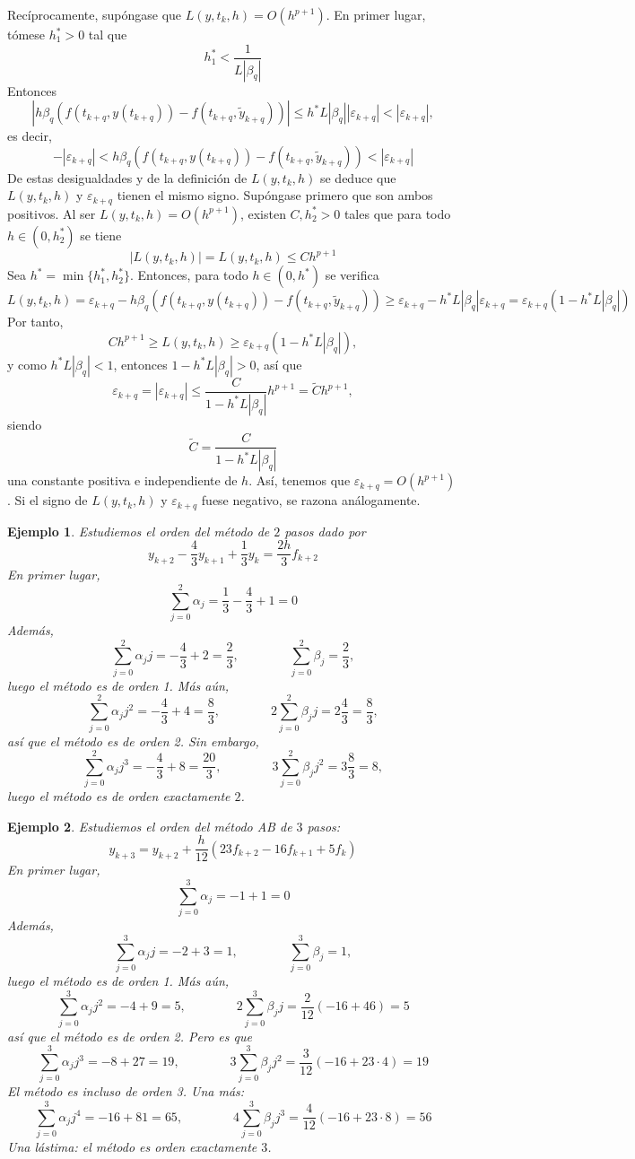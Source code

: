 \documentclass[11pt]{report}
\makeatletter
\renewenvironment{proof}[1][\proofname]{\par
  \pushQED{\qed}%
  \normalfont \topsep\z@skip %
  \trivlist
  \item[\hskip\labelsep
        \itshape
    #1\@addpunct{.}]\ignorespaces
}{%
  \popQED\endtrivlist\@endpefalse
}
\theoremstyle{mytheorem}
\theoremstyle{mydefinition}
\theoremstyle{myexample}
\newtheorem*{example}{Ejemplo}
\let\oldproofname=\proofname
\renewcommand{\proofname}{\rm\bf{\oldproofname}}}
\newcommand{\bars}[1]{\left| #1 \right|}
\makeatother
\begin{document}
\begin{proof}
Recíprocamente, supóngase que $L(y,t_k,h) = O(h^{p+1})$. En primer lugar, tómese $h^*_1>0$ tal que
\[h^*_1<\frac{1}{L|\beta_q|}\]
Entonces
\[\bars{h\beta_q\left(f(t_{k+q},y(t_{k+q}))-f(t_{k+q},\widetilde{y}_{k+q})\right) }\leq h^*L|\beta_q||\varepsilon_{k+q}| < |\varepsilon_{k+q}|,\]
es decir,
\[-|\varepsilon_{k+q}| < h\beta_q\left(f(t_{k+q},y(t_{k+q}))-f(t_{k+q},\widetilde{y}_{k+q})\right) <|\varepsilon_{k+q}|\]
De estas desigualdades y de la definición de $L(y,t_k,h)$ se deduce que $L(y,t_k,h)$ y $\varepsilon_{k+q}$ tienen el mismo signo. Supóngase primero que son ambos positivos. Al ser $L(y,t_k,h) = O(h^{p+1})$, existen $C,h^*_2>0$ tales que para todo $h \in (0,h^*_2)$ se tiene
\[|L(y,t_k,h)|=L(y,t_k,h) \leq Ch^{p+1}\]
Sea $h^* = \min\{h^*_1,h^*_2\}$. Entonces, para todo $h \in (0,h^*)$ se verifica
\[L(y,t_k,h) = \varepsilon_{k+q}-h\beta_q\left(f(t_{k+q},y(t_{k+q}))-f(t_{k+q},\widetilde{y}_{k+q})\right) \geq \varepsilon_{k+q}-h^*L|\beta_q|\varepsilon_{k+q} = \varepsilon_{k+q}(1-h^*L|\beta_q|)\]
Por tanto,
\[Ch^{p+1} \geq L(y,t_k,h) \geq \varepsilon_{k+q}(1-h^*L|\beta_q|),\]
y como $h^*L|\beta_q| < 1$, entonces $1-h^*L|\beta_q|>0$, así que
\[\varepsilon_{k+q} = |\varepsilon_{k+q}| \leq \frac{C}{1-h^*L|\beta_q|}h^{p+1} = \widetilde{C}h^{p+1},\]
siendo
\[\widetilde{C} = \frac{C}{1-h^*L|\beta_q|}\]
una constante positiva e independiente de $h$. Así, tenemos que $\varepsilon_{k+q} =O(h^{p+1})$. Si el signo de $L(y,t_k,h)$ y $\varepsilon_{k+q}$ fuese negativo, se razona análogamente.
\end{proof}

\begin{example}
Estudiemos el orden del método de $2$ pasos dado por
\[y_{k+2} -\frac{4}{3}y_{k+1} +\frac{1}{3}y_k = \frac{2h}{3}f_{k+2}\]
En primer lugar,
\[\sum_{j=0}^2 \alpha_j = \frac{1}{3}-\frac{4}{3}+1 = 0\]
Además,
\[\sum_{j=0}^2 \alpha_j j= -\frac{4}{3}+2 = \frac{2}{3}, \qquad \qquad \sum_{j=0}^2 \beta_j = \frac{2}{3},\]
luego el método es de orden 1. Más aún,
\[\sum_{j=0}^2 \alpha_j j^2 = -\frac{4}{3}+4=\frac{8}{3}, \qquad \qquad 2\sum_{j=0}^2\beta_jj =2\frac{4}{3} = \frac{8}{3},\]
así que el método es de orden 2. Sin embargo,
\[\sum_{j=0}^2 \alpha_j j^3 =-\frac{4}{3}+8 = \frac{20}{3}, \qquad \qquad 3\sum_{j=0}^2\beta_jj^2 =3\frac{8}{3} = 8,\]
luego el método es de orden exactamente $2$.
\end{example}

\begin{example}
Estudiemos el orden del método AB de $3$ pasos:
\[y_{k+3} = y_{k+2}+\frac{h}{12}(23f_{k+2}-16f_{k+1}+5f_k)\]
En primer lugar,
\[\sum_{j=0}^3 \alpha_j = -1+1 = 0\]
Además,
\[\sum_{j=0}^3 \alpha_j j= -2+3 = 1, \qquad \qquad \sum_{j=0}^3 \beta_j = 1,\]
luego el método es de orden 1. Más aún,
\[\sum_{j=0}^3 \alpha_j j^2 = -4+9 = 5, \qquad \qquad 2\sum_{j=0}^3\beta_jj = \frac{2}{12}(-16+46) = 5\]
así que el método es de orden 2. Pero es que
\[\sum_{j=0}^3 \alpha_j j^3 = -8+27 = 19, \qquad \qquad 3\sum_{j=0}^3\beta_jj^2 = \frac{3}{12}(-16+23\cdot 4) = 19\]
El método es incluso de orden 3. Una más:
\[\sum_{j=0}^3 \alpha_j j^4 =-16+81 = 65, \qquad \qquad 4\sum_{j=0}^3\beta_jj^3 =\frac{4}{12}(-16+23\cdot 8) = 56\]
Una lástima: el método es orden exactamente $3$.
\end{example}
\end{document}
